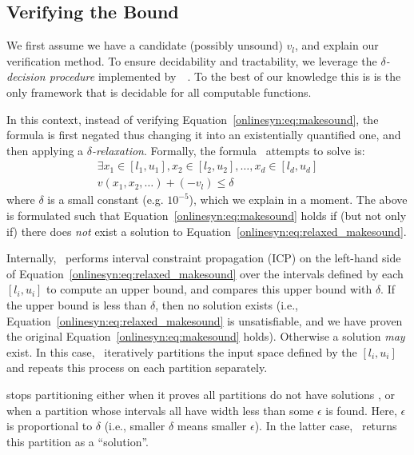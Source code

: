 \subsection{Verifying the Bound}
We first assume we have a candidate (possibly unsound) $ v_l $, and explain our
verification method.
To ensure decidability and tractability, we
leverage the \textit{$ \delta $-decision procedure} implemented
by~\dReal{}~\cite{gao2013dreal}. To the best of our knowledge this is is the only
framework that is decidable for all computable functions.

In this context, instead of verifying Equation~\ref{onlinesyn:eq:makesound}, the
formula
is first negated thus changing it into an existentially quantified one, and
then applying a $ \delta $\textit{-relaxation}. Formally, the formula~\dReal{}
attempts to solve is:
\begin{equation} \label{onlinesyn:eq:relaxed_makesound}
\begin{gathered}
\exists x_1 \in [l_1, u_1], x_2 \in [l_2, u_2], \dots, x_d \in [l_d, u_d]\\
v(x_1, x_2, \dots) + (-v_l) \leq \delta
\end{gathered}
\end{equation}
where $ \delta $ is a small constant (e.g. $ 10^{-5} $), which we explain in a
moment. The
above is formulated such that Equation~\ref{onlinesyn:eq:makesound} holds if (but
not
only if) there does \textit{not} exist a solution to
Equation~\ref{onlinesyn:eq:relaxed_makesound}.

Internally,~\dReal{} performs interval constraint propagation (ICP) on the
left-hand
side of Equation~\ref{onlinesyn:eq:relaxed_makesound} over the
intervals defined by each $ [l_i, u_i] $ to compute an upper bound, and
compares this upper bound with $ \delta $. If the upper bound is less than $
\delta $, then no solution exists (i.e.,
Equation~\ref{onlinesyn:eq:relaxed_makesound} is
unsatisfiable, and we have proven the original
Equation~\ref{onlinesyn:eq:makesound} holds). Otherwise
a solution \textit{may} exist. In this case,~\dReal{} iteratively partitions
the input space defined by the $ [l_i, u_i ] $ and repeats this process on
each partition separately.

\dReal{} stops partitioning either when
it proves all partitions do not have solutions
, or when a partition whose intervals all
have width less than some $ \epsilon $ is found. Here, $ \epsilon $ is
proportional to $
\delta $ (i.e., smaller $ \delta $ means smaller $ \epsilon $). In the latter
case,~\dReal{} returns this partition as a ``solution''.


